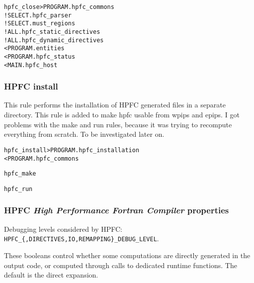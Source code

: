 \documentclass[a4paper]{report}
\newenvironment{PipsMake}{\begin{alltt}}{\end{alltt}}
\begin{document}
\begin{PipsMake}
hpfc_close             > PROGRAM.hpfc_commons
    ! SELECT.hpfc_parser
    ! SELECT.must_regions
    ! ALL.hpfc_static_directives
    ! ALL.hpfc_dynamic_directives
    < PROGRAM.entities
    < PROGRAM.hpfc_status
    < MAIN.hpfc_host
\end{PipsMake}

\subsubsection{HPFC install}

This rule performs the installation of HPFC generated files in a separate
directory. This rule is added to make hpfc usable from wpips and epips. I
got problems with the make and run rules, because it was trying to
recompute everything from scratch. To be investigated later on.

\begin{PipsMake}
hpfc_install            > PROGRAM.hpfc_installation
    < PROGRAM.hpfc_commons

hpfc_make

hpfc_run

\end{PipsMake}

\subsubsection{HPFC {\em High Performance Fortran Compiler} properties}

Debugging levels considered by HPFC:
\verb+HPFC_{,DIRECTIVES,IO,REMAPPING}_DEBUG_LEVEL+.

  These booleans control whether some computations are directly
generated in the output code, or computed through calls to dedicated
runtime functions. The default is the direct expansion.
\end{document}
